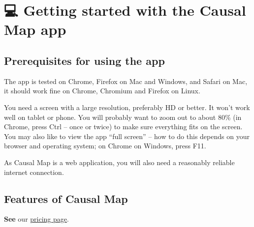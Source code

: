 \documentclass[
]{book}
\begin{document}
\hypertarget{starting}{%
\chapter{💻 Getting started with the Causal Map app}\label{starting}}

\hypertarget{prerequisites-for-using-the-app}{%
\section{Prerequisites for using the app}\label{prerequisites-for-using-the-app}}

The app is tested on Chrome, Firefox on Mac and Windows, and Safari on Mac, it should work fine on Chrome, Chromium and Firefox on Linux.

You need a screen with a large resolution, preferably HD or better. It won't work well on tablet or phone. You will probably want to zoom out to about 80\% (in Chrome, press Ctrl -- once or twice) to make sure everything fits on the screen. You may also like to view the app ``full screen'' -- how to do this depends on your browser and operating system; on Chrome on Windows, press F11.

As Causal Map is a web application, you will also need a reasonably reliable internet connection.

\hypertarget{features-of-causal-map}{%
\section{Features of Causal Map}\label{features-of-causal-map}}

\textbf{See} our \href{https://causalmap.app/pricing/}{pricing page}.
\end{document}

